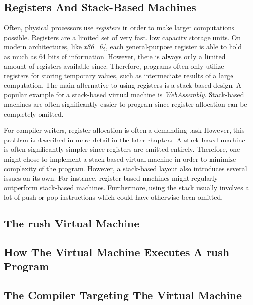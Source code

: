 \subsection{Registers And Stack-Based Machines}

Often, physical processors use \emph{registers} in order to make larger computations possible.
Registers are a limited set of very fast, low capacity storage units.
On modern architectures, like \emph{x86\_64}, each general-purpose register is able to hold as much as 64 bits of information.
However, there is always only a limited amount of registers available since.
Therefore, programs often only utilize registers for storing temporary values, such as intermediate results of a large computation.
The main alternative to using registers is a stack-based design.
A popular example for a stack-based virtual machine is \emph{WebAssembly}.
Stack-based machines are often significantly easier to program since register allocation can be completely omitted.

For compiler writers, register allocation is often a demanding task
However, this problem is described in more detail in the later chapters.
A stack-based machine is often significantly simpler since registers are omitted entirely.
Therefore, one might chose to implement a stack-based virtual machine in order to minimize complexity of the program.
However, a stack-based layout also introduces several issues on its own.
For instance, register-based machines might regularly outperform stack-based machines.
Furthermore, using the stack usually involves a lot of push or pop instructions which could have otherwise been omitted.

\subsection{The rush Virtual Machine}


\subsection{How The Virtual Machine Executes A rush Program}
\subsection{The Compiler Targeting The Virtual Machine}
